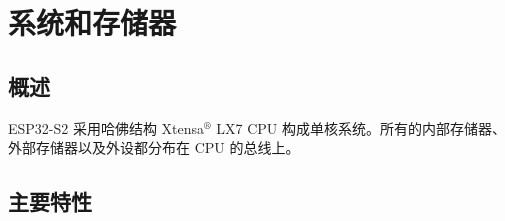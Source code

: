 \documentclass[main\_\_CN.tex]{subfiles}
\begin{document}
\setchineseformatting

\ifglobal
\else
    \listoftodos
    {\let\clearpage\relax \listofdonetodos}
    \tableofcontents
\fi




\hypertarget{sysmem}{}
\chapter{系统和存储器} 
\label{mod:sysmem}


\section{概述}

ESP32-S2 采用哈佛结构 Xtensa$^®$ LX7 CPU 构成单核系统。所有的内部存储器、外部存储器以及外设都分布在 CPU 的总线上。

\section{主要特性}
\end{document}

